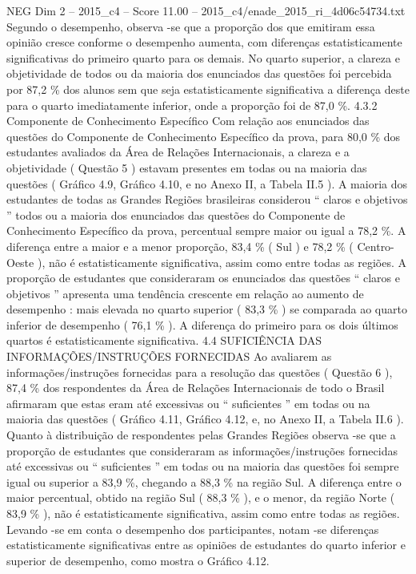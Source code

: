 \begin{textsample}{NEG Dim 2 – 2015\_c4 – Score 11.00 – 2015\_c4/enade\_2015\_ri\_4d06c54734.txt}
Segundo o desempenho, observa -se que a proporção dos que emitiram essa opinião cresce conforme o desempenho aumenta, com diferenças estatisticamente significativas do primeiro quarto para os demais.
No quarto superior, a clareza e objetividade de todos ou da maioria dos enunciados das questões foi percebida por 87,2 \% dos alunos sem que seja estatisticamente significativa a diferença deste para o quarto imediatamente inferior, onde a proporção foi de 87,0 \%. 4.3.2 Componente de Conhecimento Específico Com relação aos enunciados das questões do Componente de Conhecimento Específico da prova, para 80,0 \% dos estudantes avaliados da Área de Relações Internacionais, a clareza e a objetividade ( Questão 5 ) estavam presentes em todas ou na maioria das questões ( Gráfico 4.9, Gráfico 4.10, e no Anexo II, a Tabela II.5 ).
A maioria dos estudantes de todas as Grandes Regiões brasileiras considerou “ claros e objetivos ” todos ou a maioria dos enunciados das questões do Componente de Conhecimento Específico da prova, percentual sempre maior ou igual a 78,2 \%.
A diferença entre a maior e a menor proporção, 83,4 \% ( Sul ) e 78,2 \% ( Centro-Oeste ), não é estatisticamente significativa, assim como entre todas as regiões.
A proporção de estudantes que consideraram os enunciados das questões “ claros e objetivos ” apresenta uma tendência crescente em relação ao aumento de desempenho : mais elevada no quarto superior ( 83,3 \% ) se comparada ao quarto inferior de desempenho ( 76,1 \% ).
A diferença do primeiro para os dois últimos quartos é estatisticamente significativa. 4.4 SUFICIÊNCIA DAS INFORMAÇÕES/INSTRUÇÕES FORNECIDAS Ao avaliarem as informações/instruções fornecidas para a resolução das questões ( Questão 6 ), 87,4 \% dos respondentes da Área de Relações Internacionais de todo o Brasil afirmaram que estas eram até excessivas ou “ suficientes ” em todas ou na maioria das questões ( Gráfico 4.11, Gráfico 4.12, e, no Anexo II, a Tabela II.6 ).
Quanto à distribuição de respondentes pelas Grandes Regiões observa -se que a proporção de estudantes que consideraram as informações/instruções fornecidas até excessivas ou “ suficientes ” em todas ou na maioria das questões foi sempre igual ou superior a 83,9 \%, chegando a 88,3 \% na região Sul.
A diferença entre o maior percentual, obtido na região Sul ( 88,3 \% ), e o menor, da região Norte ( 83,9 \% ), não é estatisticamente significativa, assim como entre todas as regiões.
Levando -se em conta o desempenho dos participantes, notam -se diferenças estatisticamente significativas entre as opiniões de estudantes do quarto inferior e superior de desempenho, como mostra o Gráfico 4.12.

\end{textsample}
